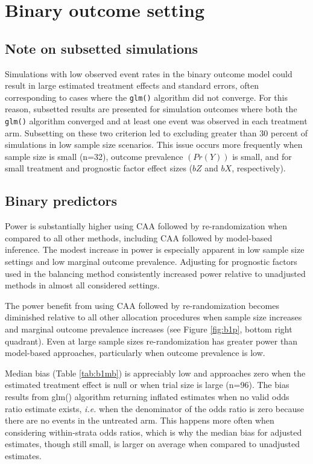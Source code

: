 \section{Binary outcome setting}
\subsection{Note on subsetted simulations}
Simulations with low observed event rates in the binary outcome model could result in large estimated treatment effects and standard errors, often corresponding to cases where the \texttt{glm()} algorithm did not converge.
For this reason, subsetted results are presented for simulation outcomes where both the \texttt{glm()} algorithm converged and at least one event was observed in each treatment arm.
Subsetting on these two criterion led to excluding greater than 30 percent of simulations in low sample size scenarios.
This issue occurs more frequently when sample size is small (n=32), outcome prevalence $(Pr(Y))$ is small, and for small treatment and prognostic factor effect sizes ($bZ$ and $bX$, respectively). 

\subsection{Binary predictors}
Power is substantially higher using CAA followed by re-randomization when compared to all other methods, including CAA followed by model-based inference.
The modest increase in power is especially apparent in low sample size settings and low marginal outcome prevalence.
Adjusting for prognostic factors used in the balancing method consistently increased power relative to unadjusted methods in almost all considered settings.

The power benefit from using CAA followed by re-randomization becomes diminished relative to all other allocation procedures when sample size increases and marginal outcome prevalence increases (see Figure \ref{fig:b1p}, bottom right quadrant).
Even at large sample sizes re-randomization has greater power than model-based approaches, particularly when outcome prevalence is low.

Median bias (Table \ref{tab:b1mb}) is appreciably low and approaches zero when the estimated treatment effect is null or when trial size is large (n=96).
The bias results from glm() algorithm returning inflated estimates when no valid odds ratio estimate exists, \textit{i.e.} when the denominator of the odds ratio is zero because there are no events in the untreated arm.
This happens more often when considering within-strata odds ratios, which is why the median bias for adjusted estimates, though still small, is larger on average when compared to unadjusted estimates.

